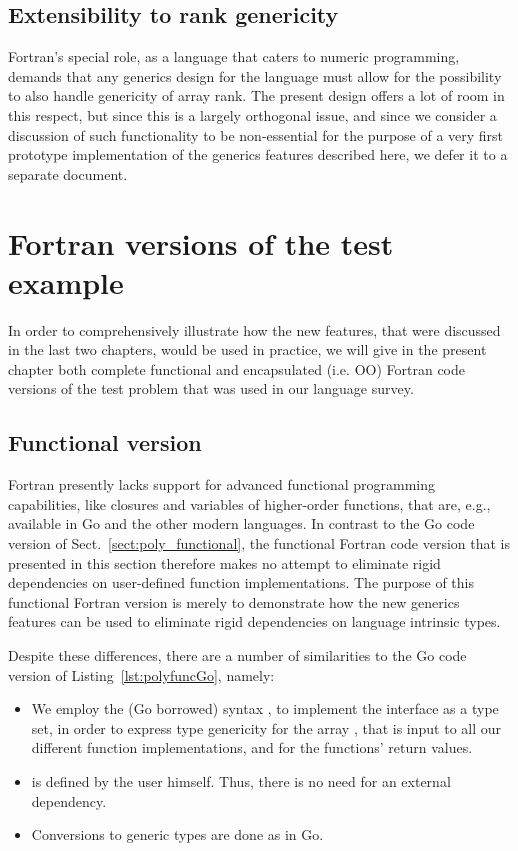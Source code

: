 \documentclass[11pt,oneside]{report}
\newcommand{\code}[1]{{\selectfont\ttfamily{#1}}}
\begin{document}
\section{Extensibility to rank genericity}

Fortran's special role, as a language that caters to numeric
programming, demands that any generics design for the language must
allow for the possibility to also handle genericity of array rank. The
present design offers a lot of room in this respect, but since this is
a largely orthogonal issue, and since we consider a discussion of such
functionality to be non-essential for the purpose of a very first
prototype implementation of the generics features described here, we
defer it to a separate document.


\chapter{Fortran versions of the test example}

In order to comprehensively illustrate how the new features, that were
discussed in the last two chapters, would be used in practice, we will
give in the present chapter both complete functional and encapsulated
(i.e. OO) Fortran code versions of the test problem that was used in
our language survey.

\section{Functional version}

Fortran presently lacks support for advanced functional programming
capabilities, like closures and variables of higher-order functions,
that are, e.g., available in Go and the other modern languages. In
contrast to the Go code version of Sect.~\ref{sect:poly_functional},
the functional Fortran code version that is presented in this section
therefore makes no attempt to eliminate rigid dependencies on
user-defined function implementations. The purpose of this functional
Fortran version is merely to demonstrate how the new generics features
can be used to eliminate rigid dependencies on language intrinsic
types.

Despite these differences, there are a number of similarities
to the Go code version of Listing~\ref{lst:polyfuncGo}, namely:
\begin{itemize}
\item
  We employ the (Go borrowed) syntax \code{integer | real(real64)}, to
  implement the interface \code{INumeric} as a type set, in order to
  express type genericity for the array \code{x}, that is input to all
  our different function implementations, and for the functions'
  return values.
\item
  \code{INumeric} is defined by the user himself. Thus, there is no
  need for an external dependency.
\item
  Conversions to generic types are done as in Go.
\end{itemize}
\end{document}
